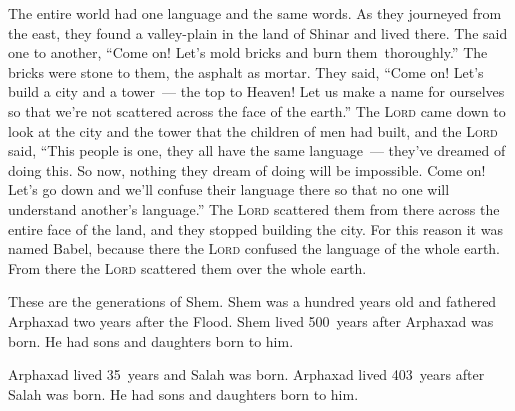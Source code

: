 
\begin{inparaenum}
   The entire world had one language and the same words.%
   As they journeyed from the east, they found a valley-plain in the land of Shinar and lived there.%
   The said one to another, ``Come on! Let's mold bricks and burn them\understood\ thoroughly.'' The bricks were stone to them, the asphalt as mortar.%
   They said, ``Come on! Let's build a city and a tower~--- the top to Heaven! Let us make a name for ourselves so that we're not scattered across the face of the earth.''%
   The \textsc{Lord} came down to look at the city and the tower that the children of men had built,%
   and the \textsc{Lord} said, ``This people is one, they all have the same language~--- they've dreamed of doing this. So now, nothing they dream of doing will be impossible.%
   Come on! Let's go down and we'll confuse their language there so that no one will understand another's language.''%
   The \textsc{Lord} scattered them from there across the entire face of the land, and they stopped building the city.%
   For this reason it was named Babel, because there the \textsc{Lord} confused the language of the whole earth. From there the \textsc{Lord} scattered them over the whole earth.%
  
   These are the generations of Shem. Shem was a hundred years old and fathered Arphaxad two years after the Flood.%
   Shem lived 500~years after Arphaxad was born. He had sons and daughters born to him.%
  
   Arphaxad lived 35~years and Salah was born.%
   Arphaxad lived 403~years after Salah was born. He had sons and daughters born to him.%
  

\end{inparaenum}
